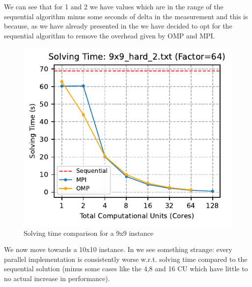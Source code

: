 We can see that for 1 and 2 we have values which are in the range of the sequential algorithm minus some seconds of delta in the measurement and this is because, as we have already presented in the  we have decided to opt for the sequential algorithm to remove the overhead given by OMP and MPI.

\begin{figure}[htbp]
\centering
\includegraphics[width=0.9\linewidth]{imgs/solving_time_mpi_omp_9x9_hard_2.pdf}
\caption{Solving time comparison for a 9x9 instance}
\label{fig:comparison_solving_time_9x9}
\end{figure}

We now move towards a 10x10 instance. In  we see something strange: every parallel implementation is consistently worse w.r.t. solving time compared to the sequential solution (minus some cases like the 4,8 and 16 CU which have little to no actual increase in performance). 

